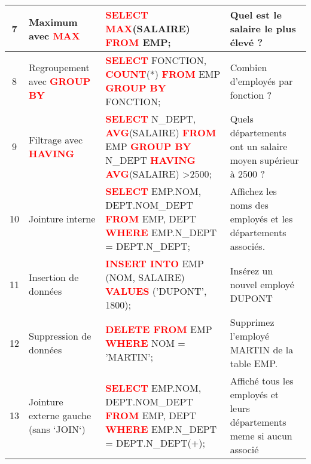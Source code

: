 \documentclass[a4paper, landscape]{article}
\begin{document}
\begin{longtable}{|c|l|p{}|p{}|}
    \hline
    7 & Maximum avec \textcolor{red}{\textbf{MAX}} & \textcolor{red}{\textbf{SELECT MAX}}(SALAIRE) \textcolor{red}{\textbf{FROM}} EMP; \newline \newline  & Quel est le salaire le plus élevé ? \\
    \hline
    8 & Regroupement avec \textcolor{red}{\textbf{GROUP BY}} & \textcolor{red}{\textbf{SELECT}} FONCTION, \textcolor{red}{\textbf{COUNT}}(*) \textcolor{red}{\textbf{FROM}} EMP \textcolor{red}{\textbf{GROUP BY}} FONCTION;\newline \newline  & Combien d'employés par fonction ? \\
    \hline
    9 & Filtrage avec \textcolor{red}{\textbf{HAVING}} & \textcolor{red}{\textbf{SELECT}} N\_DEPT, \textcolor{red}{\textbf{AVG}}(SALAIRE) \textcolor{red}{\textbf{FROM}} EMP \textcolor{red}{\textbf{GROUP BY}} N\_DEPT \textcolor{red}{\textbf{HAVING AVG}}(SALAIRE) \textgreater 2500; \newline \newline & Quels départements ont un salaire moyen supérieur à 2500 ? \\
    \hline
    10 & Jointure interne & \textcolor{red}{\textbf{SELECT}} EMP.NOM, DEPT.NOM\_DEPT \textcolor{red}{\textbf{FROM}} EMP, DEPT \textcolor{red}{\textbf{WHERE}} EMP.N\_DEPT = DEPT.N\_DEPT; \newline \newline & Affichez les noms des employés et les départements associés. \\
    \hline
    11 & Insertion de données & \textcolor{red}{\textbf{INSERT INTO}} EMP (NOM, SALAIRE) \textcolor{red}{\textbf{VALUES}} ('DUPONT', 1800);\newline \newline  & Insérez un nouvel employé DUPONT \\
    \hline
    12 & Suppression de données & \textcolor{red}{\textbf{DELETE FROM}} EMP \textcolor{red}{\textbf{WHERE}} NOM = 'MARTIN'; \newline \newline & Supprimez l'employé MARTIN de la table EMP. \\
    \hline
    13 & Jointure externe gauche (sans `JOIN`) & \textcolor{red}{\textbf{SELECT}} EMP.NOM, DEPT.NOM\_DEPT \textcolor{red}{\textbf{FROM}} EMP, DEPT \textcolor{red}{\textbf{WHERE}} EMP.N\_DEPT = DEPT.N\_DEPT(+); \newline \newline
& Affiché tous les employés et leurs départements meme si aucun associé \\

\end{longtable}
\end{document}
